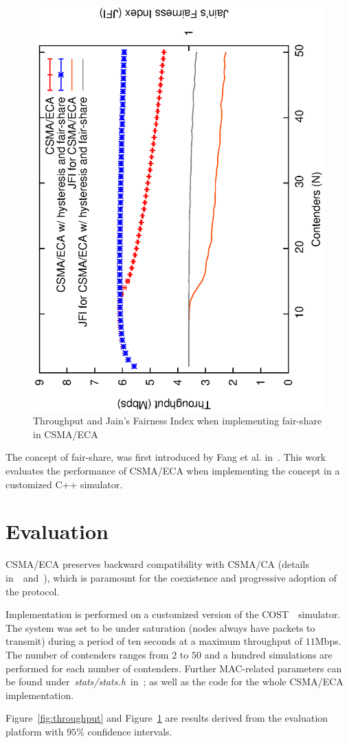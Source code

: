 \begin{figure}[htbp]
  \centering
  \includegraphics[width=0.7\linewidth, angle = -90]{figures/errorPlots/ECA-w-enhancements-fixed.eps}
  \caption{Throughput and Jain's Fairness Index when implementing fair-share in CSMA/ECA
  \label{fig:fairShare}}
\end{figure}

The concept of fair-share, was first introduced by Fang et al. in~\cite{L_MAC2}. This work evaluates the performance of CSMA/ECA when implementing the concept in a customized C++ simulator.

\section{Evaluation}
CSMA/ECA preserves backward compatibility with CSMA/CA (details in~\cite{CSMA_ECA}~and~\cite{HE}), which is paramount for the coexistence and progressive adoption of the protocol. 


Implementation is performed on a customized version of the COST~\cite{COST}~simulator. The system was set to be under saturation (nodes always have packets to transmit) during a period of ten seconds at a maximum throughput of $11$Mbps. The number of contenders ranges from $2$ to $50$ and a hundred simulations are performed for each number of contenders. Further MAC-related parameters can be found under~\emph{stats/stats.h}~in~\cite{sim:parameters}; as well as the code for the whole CSMA/ECA implementation.

Figure~\ref{fig:throughput} and Figure~\ref{fig:fairShare} are results derived from the evaluation platform with $95\%$ confidence intervals.